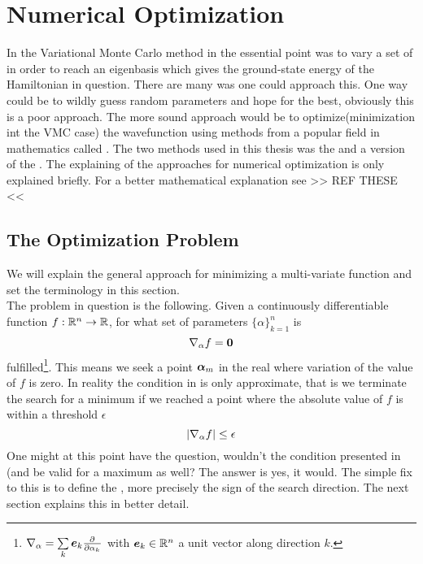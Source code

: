 \chapter{Numerical Optimization \label{chapter:6}}
    In the Variational Monte Carlo method in  the essential point
    was to vary a set of  in order to reach an
    eigenbasis which gives the ground-state energy of the Hamiltonian in
    question. There are many was one could approach this. One way could be to
    wildly guess random parameters and hope for the best, obviously this is a
    poor approach. The more sound approach would be to optimize(minimization
    int the VMC case) the wavefunction using methods from a popular field in
    mathematics called . The two methods used in
    this thesis was the  and a version of the
    . The explaining of the
    approaches for numerical optimization is only explained briefly. For a
    better mathematical explanation see >> REF THESE <<

\section{The Optimization Problem \label{sec:the_optimization_problem}}
    We will explain the general approach for minimizing a multi-variate
    function and set the terminology in this section. \\

    The problem in question is the following. Given a continuously
    differentiable function $f:\mathbb{R}^n\rightarrow\mathbb{R}$, for what set of
    parameters $\{\alpha\}^{n}_{k=1}$ is 
        \begin{equation}
            \nabla_{\alpha} f = \boldsymbol{{0}}
            \label{eq:mincondition}
        \end{equation}
    fulfilled\footnote{$\nabla_{\alpha}=\sum\limits_k\blds{e}_k\prd{\alpha_k}$
    with $\boldsymbol{{e}}_k\in\mathbb{R}^n$ a unit vector along direction $k$.}. This
    means we seek a point $\boldsymbol{{\alpha}}_m$ in the real where variation of the
    value of $f$ is zero. In reality the condition in  is
    only approximate, that is we terminate the search for a minimum if we
    reached a point where the absolute value of $f$ is within a threshold
    $\epsilon$
        \begin{equation}
            \abs{\nabla_{\alpha} f} \leq \epsilon
            \label{eq:minconditionapprox}
        \end{equation}
    One might at this point have the question, wouldn't the condition presented
    in (and  be valid for a
    maximum as well? The answer is yes, it would. The simple fix to this is to
    define the , more precisely the sign of the search
    direction. The next section explains this in better detail.

